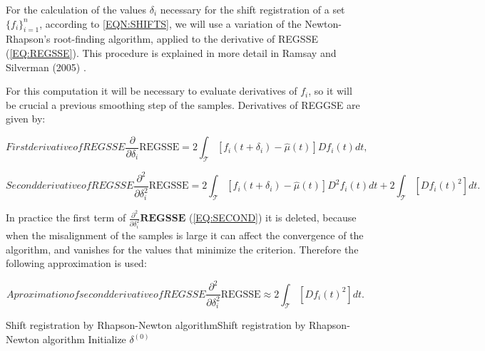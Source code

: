 

For the calculation of the values $\delta_i$ necessary for the shift registration of a set  $\{f_i\}_{i=1}^{n}$, according to \ref{EQN:SHIFTS},
we will use a variation of the Newton-Rhapson's root-finding algorithm, applied
to the derivative of REGSSE (\ref{EQ:REGSSE}). This procedure is explained in more detail
in Ramsay and Silverman (2005) \cite{Ramsay2005}.

For this computation it will be necessary to evaluate derivatives of
$f_i$, so it will be crucial a previous smoothing step of the samples.
Derivatives of REGGSE are given by:

\begin{equation}[EQ:FIRST]{First derivative of REGSSE}
\frac{\partial}{\partial \delta_i} \text{REGSSE} = 2 \int_{\mathcal{T}}
\left [ f_i(t + \delta_i) - \hat \mu(t) \right ] Df_i(t) dt,
\end{equation}

\begin{equation}[EQ:SECOND]{Second derivative of REGSSE}
\frac{\partial^2}{\partial \delta^2_i} \text{REGSSE} = 2
\int_{\mathcal{T}} \left [ f_i(t + \delta_i) - \hat \mu(t) \right ]
D^2f_i(t) dt + 2 \int_{\mathcal{T}} \left [  Df_i(t)^2 \right ]  dt.
\end{equation}

In practice the first term of $\frac{\partial^2}{\partial \delta^2_i}\textbf{REGSSE}$
(\ref{EQ:SECOND}) it is deleted, because when the misalignment of the samples is large it
can affect the convergence of the algorithm, and vanishes for the values that
minimize the criterion. Therefore the following approximation is used:

\begin{equation}[]{Aproximation of second derivative of REGSSE}
\frac{\partial^2}{\partial \delta^2_i} \text{REGSSE} \approx  
2 \int_{\mathcal{T}} \left [  Df_i(t)^2 \right ]  dt.
\end{equation}

\begin{algorithmN}{Shift registration by Rhapson-Newton algorithm}{Shift registration by Rhapson-Newton algorithm}
	\BlankLine
	Initialize $\delta^{(0)}$ \;
	
\end{algorithmN}

